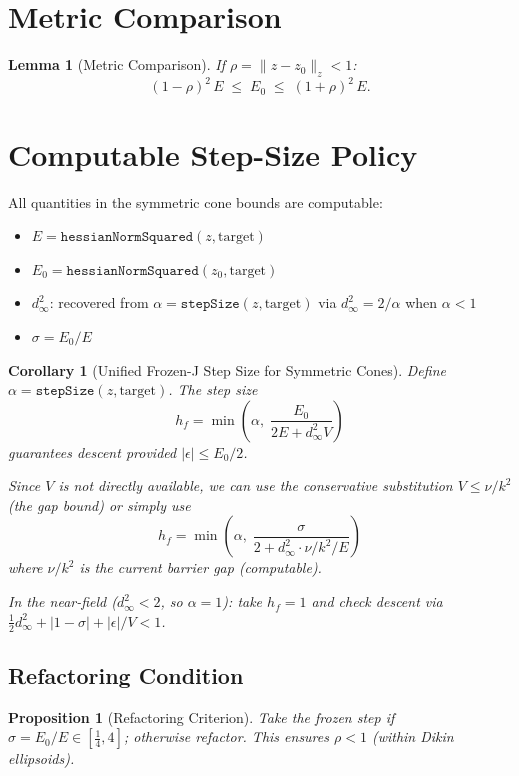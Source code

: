 \documentclass[11pt]{article}
\newtheorem{lemma}[theorem]{Lemma}
\newtheorem{corollary}[theorem]{Corollary}
\newtheorem{proposition}[theorem]{Proposition}
\begin{document}
\section{Metric Comparison}

\begin{lemma}[Metric Comparison]
\label{lem:metric_comparison}
If $\rho = \|z - z_0\|_z < 1$:
\begin{equation}
    (1-\rho)^2\, E \;\le\; E_0 \;\le\; (1+\rho)^2\, E.
\end{equation}
\end{lemma}

\section{Computable Step-Size Policy}

All quantities in the symmetric cone bounds are computable:
\begin{itemize}
    \item $E = \texttt{hessianNormSquared}(z, \text{target})$
    \item $E_0 = \texttt{hessianNormSquared}(z_0, \text{target})$
    \item $d_\infty^2$: recovered from
      $\alpha = \texttt{stepSize}(z, \text{target})$ via
      $d_\infty^2 = 2/\alpha$ when $\alpha < 1$
    \item $\sigma = E_0/E$
\end{itemize}

\begin{corollary}[Unified Frozen-J Step Size for Symmetric Cones]
\label{cor:sym_unified}
Define $\alpha = \texttt{stepSize}(z, \text{target})$.  The step size
\begin{equation}
    h_f = \min\!\left(\alpha,\; \frac{E_0}{2E + d_\infty^2 V}\right)
\end{equation}
guarantees descent provided $|\epsilon| \le E_0/2$.

Since $V$ is not directly available, we can use the conservative
substitution $V \le \nu/k^2$ (the gap bound) or simply use
\begin{equation}
    h_f = \min\!\left(\alpha,\; \frac{\sigma}{2 + d_\infty^2 \cdot \nu/k^2 / E}\right)
\end{equation}
where $\nu/k^2$ is the current barrier gap (computable).

In the near-field ($d_\infty^2 < 2$, so $\alpha = 1$): take $h_f = 1$
and check descent via $\frac{1}{2}d_\infty^2 + |1-\sigma| + |\epsilon|/V < 1$.
\end{corollary}

\subsection{Refactoring Condition}

\begin{proposition}[Refactoring Criterion]
\label{prop:refactor}
Take the frozen step if $\sigma = E_0/E \in [\tfrac{1}{4}, 4]$;
otherwise refactor.  This ensures $\rho < 1$ (within Dikin ellipsoids).
\end{proposition}
\end{document}
